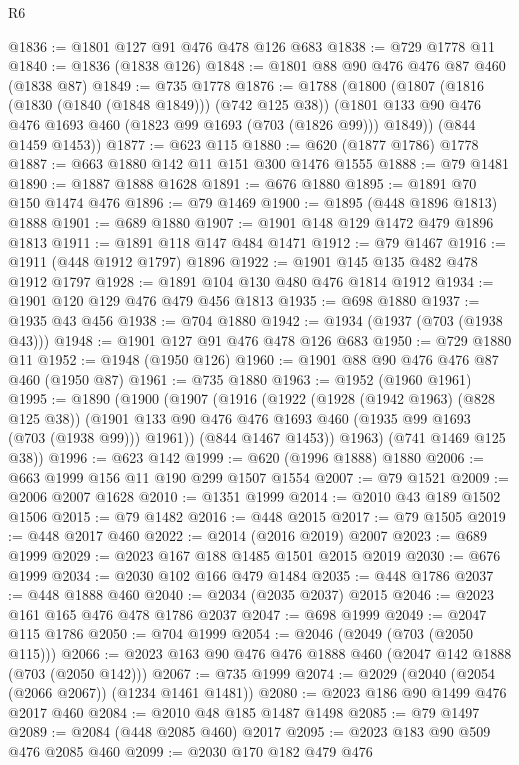 \begin{lexlean}{R6}
\begin{coremodule}
@1836 := @1801 @127 @91 @476 @478 @126 @683
@1838 := @729 @1778 @11
@1840 := @1836 (@1838 @126)
@1848 := @1801 @88 @90 @476 @476 @87 @460 (@1838 @87)
@1849 := @735 @1778
@1876 := @1788
    (@1800
      (@1807
        (@1816 (@1830 (@1840 (@1848 @1849))) (@742 @125 @38))
        (@1801 @133 @90 @476 @476 @1693 @460 (@1823 @99 @1693 (@703 (@1826 @99))) @1849))
      (@844 @1459 @1453))
@1877 := @623 @115
@1880 := @620 (@1877 @1786) @1778
@1887 := @663 @1880 @142 @11 @151 @300 @1476 @1555
@1888 := @79 @1481
@1890 := @1887 @1888 @1628
@1891 := @676 @1880
@1895 := @1891 @70 @150 @1474 @476
@1896 := @79 @1469
@1900 := @1895 (@448 @1896 @1813) @1888
@1901 := @689 @1880
@1907 := @1901 @148 @129 @1472 @479 @1896 @1813
@1911 := @1891 @118 @147 @484 @1471
@1912 := @79 @1467
@1916 := @1911 (@448 @1912 @1797) @1896
@1922 := @1901 @145 @135 @482 @478 @1912 @1797
@1928 := @1891 @104 @130 @480 @476 @1814 @1912
@1934 := @1901 @120 @129 @476 @479 @456 @1813
@1935 := @698 @1880
@1937 := @1935 @43 @456
@1938 := @704 @1880
@1942 := @1934 (@1937 (@703 (@1938 @43)))
@1948 := @1901 @127 @91 @476 @478 @126 @683
@1950 := @729 @1880 @11
@1952 := @1948 (@1950 @126)
@1960 := @1901 @88 @90 @476 @476 @87 @460 (@1950 @87)
@1961 := @735 @1880
@1963 := @1952 (@1960 @1961)
@1995 := @1890
    (@1900
      (@1907
        (@1916
          (@1922
            (@1928 (@1942 @1963) (@828 @125 @38))
            (@1901 @133 @90 @476 @476 @1693 @460 (@1935 @99 @1693 (@703 (@1938 @99))) @1961))
          (@844 @1467 @1453))
        @1963)
      (@741 @1469 @125 @38))
@1996 := @623 @142
@1999 := @620 (@1996 @1888) @1880
@2006 := @663 @1999 @156 @11 @190 @299 @1507 @1554
@2007 := @79 @1521
@2009 := @2006 @2007 @1628
@2010 := @1351 @1999
@2014 := @2010 @43 @189 @1502 @1506
@2015 := @79 @1482
@2016 := @448 @2015
@2017 := @79 @1505
@2019 := @448 @2017 @460
@2022 := @2014 (@2016 @2019) @2007
@2023 := @689 @1999
@2029 := @2023 @167 @188 @1485 @1501 @2015 @2019
@2030 := @676 @1999
@2034 := @2030 @102 @166 @479 @1484
@2035 := @448 @1786
@2037 := @448 @1888 @460
@2040 := @2034 (@2035 @2037) @2015
@2046 := @2023 @161 @165 @476 @478 @1786 @2037
@2047 := @698 @1999
@2049 := @2047 @115 @1786
@2050 := @704 @1999
@2054 := @2046 (@2049 (@703 (@2050 @115)))
@2066 := @2023 @163 @90 @476 @476 @1888 @460 (@2047 @142 @1888 (@703 (@2050 @142)))
@2067 := @735 @1999
@2074 := @2029 (@2040 (@2054 (@2066 @2067)) (@1234 @1461 @1481))
@2080 := @2023 @186 @90 @1499 @476 @2017 @460
@2084 := @2010 @48 @185 @1487 @1498
@2085 := @79 @1497
@2089 := @2084 (@448 @2085 @460) @2017
@2095 := @2023 @183 @90 @509 @476 @2085 @460
@2099 := @2030 @170 @182 @479 @476

\end{coremodule}
\end{lexlean}
